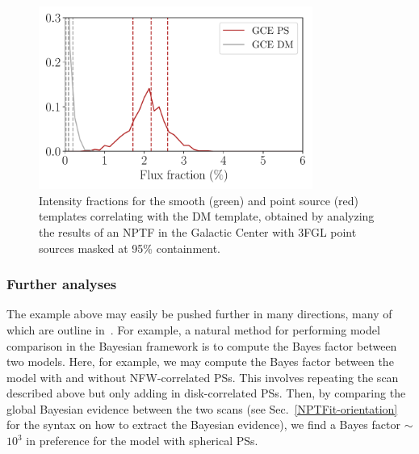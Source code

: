 \begin{figure}[htbp]
\centering
\includegraphics[width=0.8\textwidth]{ch-nptfit/gce_intensity_fraction.pdf} 
\caption{Intensity fractions for the smooth (green) and point source (red) templates correlating with the DM template, obtained by analyzing the results of an NPTF in the Galactic Center with 3FGL point sources masked at 95\% containment.}
\label{fig:gc_intensity}
\end{figure}

\subsubsection{Further analyses}

The example above may easily be pushed further in many directions, many of which are outline in~\cite{Lee:2015fea}.  For example, a natural method for performing model comparison in the Bayesian framework is to compute the Bayes factor between two models.  Here, for example, we may compute the Bayes factor between the model with and without NFW-correlated PSs.  This involves repeating the scan described above but only adding in disk-correlated PSs.  Then, by comparing the global Bayesian evidence between the two scans (see Sec.~\ref{NPTFit-orientation} for the syntax on how to extract the Bayesian evidence), we find a Bayes factor $\sim$$10^3$ in preference for the model with spherical PSs.

